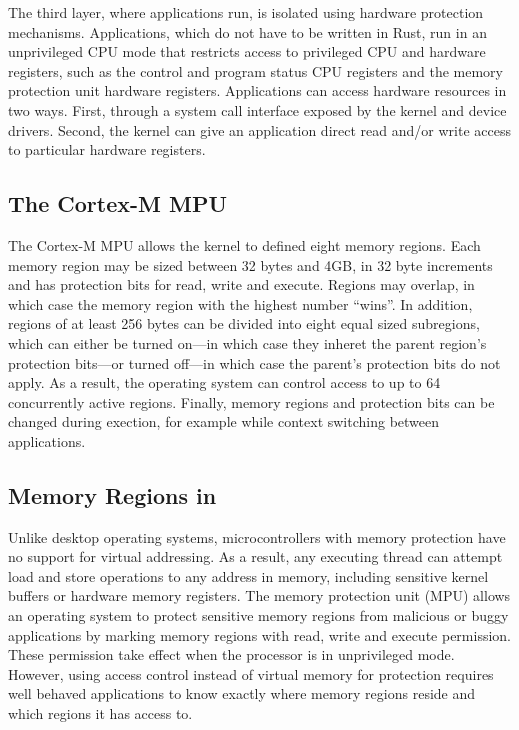 The third layer, where applications run, is isolated using hardware protection
mechanisms. Applications, which do not have to be written in Rust, run in an
unprivileged CPU mode that restricts access to privileged CPU and hardware
registers, such as the control and program status CPU registers and the memory
protection unit hardware registers. Applications can access hardware resources
in two ways. First, through a system call interface exposed by the kernel and
device drivers.  Second, the kernel can give an application direct read and/or
write access to particular hardware registers.


\subsection{The Cortex-M MPU}

The Cortex-M MPU allows the kernel to defined eight memory regions. Each memory
region may be sized between 32 bytes and 4GB, in 32 byte increments and has
protection bits for read, write and execute. Regions may overlap, in which case
the memory region with the highest number ``wins''. In addition, regions of at
least 256 bytes can be divided into eight equal sized subregions, which can
either be turned on---in which case they inheret the parent region's protection
bits---or turned off---in which case the parent's protection bits do not apply.
As a result, the operating system can control access to up to 64 concurrently
active regions. Finally, memory regions and protection bits can be changed
during exection, for example while context switching between applications.

\subsection{Memory Regions in \name}

Unlike desktop operating systems, microcontrollers with memory protection have
no support for virtual addressing. As a result, any executing thread can attempt
load and store operations to any address in memory, including sensitive kernel
buffers or hardware memory registers. The memory protection unit (MPU) allows an
operating system to protect sensitive memory regions from malicious or buggy
applications by marking memory regions with read, write and execute permission.
These permission take effect when the processor is in unprivileged mode.
However, using access control instead of virtual memory for protection requires
well behaved applications to know exactly where memory regions reside and which
regions it has access to.

